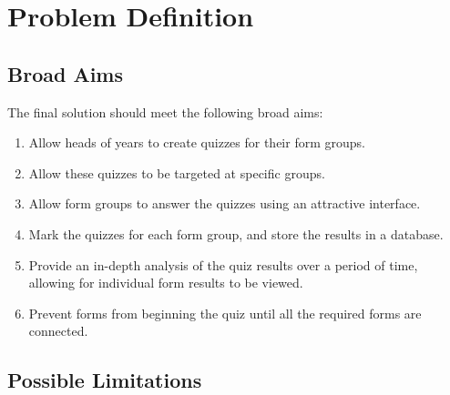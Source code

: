 \section{Problem Definition}

\subsection{Broad Aims}
The final solution should meet the following broad aims:

\begin{enumerate}
	\item Allow heads of years to create quizzes for their form groups.
	\item Allow these quizzes to be targeted at specific groups.
	\item Allow form groups to answer the quizzes using an attractive interface.
	\item Mark the quizzes for each form group, and store the results in a database.
	\item Provide an in-depth analysis of the quiz results over a period of time, allowing for individual form results to be viewed.
	\item Prevent forms from beginning the quiz until all the required forms are connected.
\end{enumerate}

\subsection{Possible Limitations}
